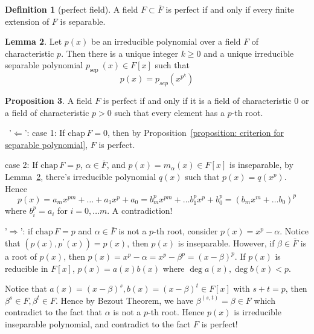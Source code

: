 \documentclass[a4paper,12pt]{article}
\newenvironment{prooff}{{\noindent\it\textcolor{cyan!40!black}{Proof}:}\,}{\par}
\newcommand{\p}{^{\prime}}
\theoremstyle{definition}
\newtheorem{defn}{Definition}[subsection]
\newtheorem{lem}[defn]{Lemma}
\newtheorem{prop}[defn]{Proposition}
\begin{document}
\begin{defn}[perfect field]
    A field $F\subset \bar{F}$ is perfect if and only if every finite extension of $F$ is separable.
\end{defn}
\begin{lem}
    Let $p(x)$ be an irreducible polynomial over a field $F$ of characteristic $p$. Then there is a unique integer $k \geq 0$ and a unique irreducible separable polynomial $p_{\text {sep }}(x) \in F[x]$ such that
    $$
        p(x)=p_{sep}\left(x^{p^k}\right)
    $$
    \label{lemma:p(x)=psep(x^p^k)}
\end{lem}
\begin{prop}
    A field $F$ is perfect if and only if it is a field of characteristic $0$ or a field of characteristic $p>0$ such that every element has a $p$-th root.
\end{prop}
\begin{prooff}
    '$\Longleftarrow$':
    case 1: If $\text{chap}\, F=0$, then by Proposition~\ref{proposition: criterion for separable polynomial}, $F$ is perfect.

    case 2: If $\text{chap}\, F=p$, $\alpha\in \bar{F}$, and $p(x)=m_{\alpha}(x)\in F[x]$ is inseparable, by Lemma~\ref{lemma:p(x)=psep(x^p^k)}, there's irreducible polynomial $q(x)$ such that $p(x)=q(x^p)$.
    Hence $$p(x)=a_m x^{pm}+\dots+ a_1 x^{p}+a_0=b^p_m x^{pm}+\dots b^p_1 x^{p}+b_0^p=(b_mx^m+\dots b_0)^p$$
    where $b_i^p=a_i$ for $i=0,\dots m$. A contradiction!

    '$\Longrightarrow$': if $\text{chap}\, F=p$ and $\alpha\in \bar{F}$ is not a $p$-th root, consider $p(x)=x^p-\alpha$. Notice that $(p(x),p\p(x))=p(x)$, then $p(x)$ is inseparable. However, if $\beta\in \bar{F}$ is a root of $p(x)$, then $p(x)=x^p-\alpha=x^p-\beta^p=(x-\beta)^p$.
    If $p(x)$ is reducible in $F[x]$, $p(x)=a(x)b(x)$ where $\deg a(x),\deg b(x)<p$.

    Notice that $a(x)=(x-\beta)^{s},b(x)=(x-\beta)^{t}\in F[x]$ with $s+t=p$, then $\beta^s\in F,\beta^t\in F$. Hence by Bezout Theorem, we have $\beta^{(s,t)}=\beta\in F$ which contradict to the fact that $\alpha$ is not a $p$-th root. Hence $p(x)$ is irreducible inseparable polynomial, and contradict to the fact $F$ is perfect!
\end{prooff}
\end{document}
